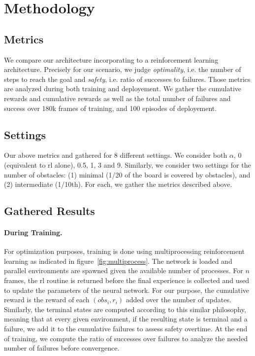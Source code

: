 \section{Methodology} 

\subsection{Metrics}
We compare our architecture incorporating \dio{} to a reinforcement learning architecture. 
Precisely for our scenario, we judge \emph{optimality}, i.e. the number of steps to reach the goal and 
\emph{safety}, i.e. ratio of successes to failures. Those metrics are analyzed during both training and deployement. 
We gather the cumulative rewards and cumulative rewards as well as the total number of failures and success over 180k frames of training, and 100 episodes of deployement. 

\subsection{Settings} 
Our above metrics and gathered for 8 different settings. We consider both $\alpha$, 0 (equivalent to rl alone), 0.5, 1, 3 and 9. 
Similarly, we consider two settings for the number of obstacles: (1) minimal (1/20 of the board is covered by obstacles), and (2) intermediate (1/10th).
For each, we gather the metrics described above. 

\subsection{Gathered Results} 
\paragraph{During Training.} For optimization purposes, training is done using multiprocessing reinforcement learning as indicated in figure~\ref{fig:multiprocess}. 
The network is loaded and parallel environments are spawned given the available number of processes. For $n$ frames, the rl routine is returned before the final experience is collected 
and used to update the parameters of the neural network. For our purpose, the cumulative reward is the reward of each $(obs_i, r_i)$ added over the number of updates. 
Similarly, the terminal states are computed according to this similar philosophy, meaning that at every given environment, if the resulting state is terminal and a failure, we add it to the cumulative failures to assess 
safety overtime. At the end of training, we compute the ratio of successes over failures to analyze the needed number of failures before convergence.

